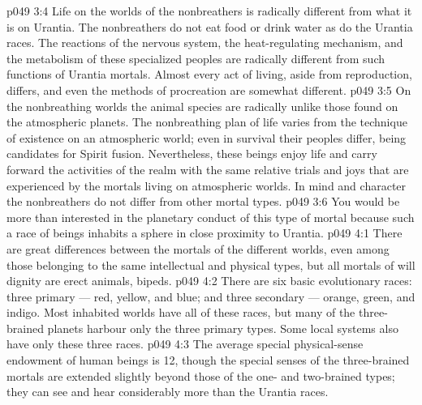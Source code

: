 \vs p049 3:4 Life on the worlds of the nonbreathers is radically different from what it is on Urantia. The nonbreathers do not eat food or drink water as do the Urantia races. The reactions of the nervous system, the heat\hyp{}regulating mechanism, and the metabolism of these specialized peoples are radically different from such functions of Urantia mortals. Almost every act of living, aside from reproduction, differs, and even the methods of procreation are somewhat different.
\vs p049 3:5 On the nonbreathing worlds the animal species are radically unlike those found on the atmospheric planets. The nonbreathing plan of life varies from the technique of existence on an atmospheric world; even in survival their peoples differ, being candidates for Spirit fusion. Nevertheless, these beings enjoy life and carry forward the activities of the realm with the same relative trials and joys that are experienced by the mortals living on atmospheric worlds. In mind and character the nonbreathers do not differ from other mortal types.
\vs p049 3:6 You would be more than interested in the planetary conduct of this type of mortal because such a race of beings inhabits a sphere in close proximity to Urantia.
\vs p049 4:1 There are great differences between the mortals of the different worlds, even among those belonging to the same intellectual and physical types, but all mortals of will dignity are erect animals, bipeds.
\vs p049 4:2 There are six basic evolutionary races: three primary --- red, yellow, and blue; and three secondary --- orange, green, and indigo. Most inhabited worlds have all of these races, but many of the three\hyp{}brained planets harbour only the three primary types. Some local systems also have only these three races.
\vs p049 4:3 The average special physical\hyp{}sense endowment of human beings is 12, though the special senses of the three\hyp{}brained mortals are extended slightly beyond those of the one\hyp{} and two\hyp{}brained types; they can see and hear considerably more than the Urantia races.
